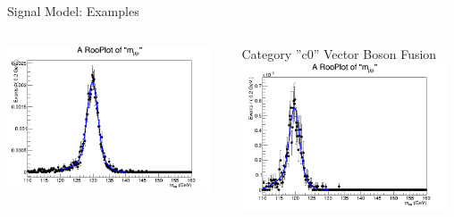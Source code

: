 \documentclass[pdf, 9pt]{beamer}
\begin{document}
\begin{frame}{Signal Model: Examples}
\begin{columns}[T]
\begin{column}{0.33\textwidth}
\begin{center}
          \includegraphics[width=0.95\textwidth, height=0.3\textheight]{figs/higgs/signalmodel/bdt/bdt_110to160_withSys/signalFit__c0__130__GluGlu__TripleGaus__default.png}
        \end{center}
      \end{column}
      \begin{column}{0.33\textwidth}
        \begin{center}
          \tiny{Category ''c0'' Vector Boson Fusion}\\
          \includegraphics[width=0.95\textwidth, height=0.3\textheight]{figs/higgs/signalmodel/bdt/bdt_110to160_withSys/signalFit__c0__120__VBF__TripleGaus__default.png}\\

\end{center}
\end{column}
\end{columns}
\end{frame}
\end{document}
